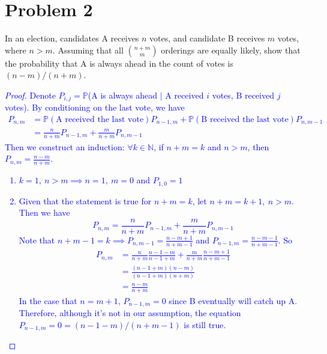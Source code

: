 \documentclass{article}
\begin{document}
\section*{Problem 2}
In an election, candidates A receives $n$ votes, and candidate B receives $m$ votes, where $n>m$. Assuming that all {\LARGE$\genfrac(){0pt}{2}{n+m}{m}$} orderings are equally likely, show that the probability that A is always ahead in the count of votes is $(n-m)/(n+m)$.
\textcolor{blue}{
\begin{proof}
   Denote $P_{i,j} = \mathbb{P}$(A is always ahead $|$ A received $i$ votes, B received $j$ votes). By conditioning on the last vote, we have
   \begin{equation*}
   \begin{split}
        P_{n,m} &= \mathbb{P}(\text{A received the last vote})P_{n-1,m}+\mathbb{P}(\text{B received the last vote})P_{n,m-1}\\
                &= \frac{n}{n+m}P_{n-1,m}+\frac{m}{n+m} P_{n,m-1}
   \end{split}
   \end{equation*}
   Then we construct an induction: $\forall k \in \mathbb{N}$, if $n+m = k$ and $n>m$, then $P_{n,m}=\frac{n-m}{n+m}$.\\
   \begin{enumerate}
       \item $k = 1,\ n>m \implies n=1, \ m=0$ and $P_{1,0} = 1$\\
       \item Given that the statement is true for $n+m=k$, let $n+m = k+1, \ n>m$. Then we have
            \begin{equation*}
                P_{n,m} = \frac{n}{n+m}P_{n-1,m}+\frac{m}{n+m} P_{n,m-1}
            \end{equation*}
            Note that $n+m-1=k \implies P_{n,m-1} = \frac{n-m+1}{n+m-1}$ and $P_{n-1,m}=\frac{n-m-1}{n+m-1}$. So
            \begin{equation*}
            \begin{split}
                P_{n,m} &= \frac{n}{n+m}\frac{n-1-m}{n-1+m}+\frac{m}{n+m}\frac{n-m+1}{n+m-1}\\
                        &= \frac{(n-1+m)(n-m)}{(n-1+m)(n+m)}\\
                        &= \frac{n-m}{n+m}
            \end{split}
            \end{equation*}
            In the case that $n=m+1$, $P_{n-1,m}=0$ since B eventually will catch up A. Therefore, although it's not in our assumption, the equation $P_{n-1,m}=0=(n-1-m)/(n+m-1)$ is still true.
   \end{enumerate}
\end{proof}
}
\end{document}
